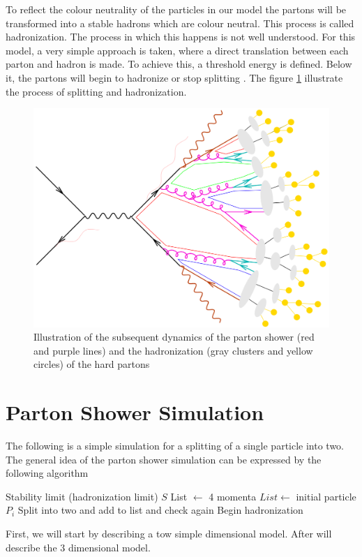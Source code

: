 To reflect the colour neutrality of the particles in our model the partons will be transformed into a stable hadrons which are colour neutral. This process is called hadronization. The process in which this happens is not well understood. For this model, a very simple approach is taken, where a direct translation between each parton and hadron is made. To achieve  this, a threshold energy is defined. Below it, the partons will begin to hadronize or stop splitting \citep{Salam:2010zt}.  The figure \ref{fig:hadronization} illustrate the process of splitting and hadronization.  
\begin{figure}
\centering
\includegraphics[scale=.4]{images/partonshower.png}
\caption{Illustration of the subsequent dynamics of the parton shower (red and purple lines) and the hadronization (gray clusters and yellow circles) of the hard partons}\label{fig:hadronization}
\end{figure}


\section{Parton Shower Simulation}

The following is a simple simulation for a splitting of a single particle into two. The general idea of the parton shower simulation can be expressed by the following algorithm \begin{algorithmic}
\State Stability limit (hadronization limit) $S$  
\State List $\gets$  4 momenta
\State $List \gets$ initial particle $P_{i}$
	\State Split into two and add to list and check again 
\Else 
	\State Begin hadronization  
\EndIf
\end{algorithmic}
First, we will start by describing a tow simple  dimensional model. After will describe the 3 dimensional model. 

